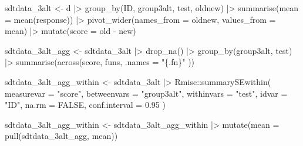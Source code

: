 \documentclass[
  man,floatsintext]{apa7}
\newenvironment{Shaded}{\begin{snugshade}}{\end{snugshade}}
\newcommand{\AttributeTok}[1]{\textcolor[rgb]{0.77,0.63,0.00}{#1}}
\newcommand{\ConstantTok}[1]{\textcolor[rgb]{0.00,0.00,0.00}{#1}}
\newcommand{\FloatTok}[1]{\textcolor[rgb]{0.00,0.00,0.81}{#1}}
\newcommand{\FunctionTok}[1]{\textcolor[rgb]{0.00,0.00,0.00}{#1}}
\newcommand{\NormalTok}[1]{#1}
\newcommand{\OtherTok}[1]{\textcolor[rgb]{0.56,0.35,0.01}{#1}}
\newcommand{\SpecialCharTok}[1]{\textcolor[rgb]{0.00,0.00,0.00}{#1}}
\newcommand{\StringTok}[1]{\textcolor[rgb]{0.31,0.60,0.02}{#1}}
\begin{document}
\begin{Shaded}
\begin{Highlighting}[]
\NormalTok{sdtdata\_3alt }\OtherTok{\textless{}{-}}\NormalTok{ d }\SpecialCharTok{|\textgreater{}}
  \FunctionTok{group\_by}\NormalTok{(ID, group3alt, test, oldnew) }\SpecialCharTok{|\textgreater{}}
  \FunctionTok{summarise}\NormalTok{(}\AttributeTok{mean =} \FunctionTok{mean}\NormalTok{(response)) }\SpecialCharTok{|\textgreater{}}
  \FunctionTok{pivot\_wider}\NormalTok{(}\AttributeTok{names\_from =}\NormalTok{ oldnew, }\AttributeTok{values\_from =}\NormalTok{ mean) }\SpecialCharTok{|\textgreater{}}
  \FunctionTok{mutate}\NormalTok{(}\AttributeTok{score =}\NormalTok{ old }\SpecialCharTok{{-}}\NormalTok{ new)}

\NormalTok{sdtdata\_3alt\_agg }\OtherTok{\textless{}{-}}\NormalTok{ sdtdata\_3alt }\SpecialCharTok{|\textgreater{}}
  \FunctionTok{drop\_na}\NormalTok{() }\SpecialCharTok{|\textgreater{}}
  \FunctionTok{group\_by}\NormalTok{(group3alt, test) }\SpecialCharTok{|\textgreater{}}
  \FunctionTok{summarise}\NormalTok{(}\FunctionTok{across}\NormalTok{(score, funs,}
    \AttributeTok{.names =} \StringTok{"\{.fn\}"}
\NormalTok{  ))}

\NormalTok{sdtdata\_3alt\_agg\_within }\OtherTok{\textless{}{-}}\NormalTok{ sdtdata\_3alt }\SpecialCharTok{|\textgreater{}}
\NormalTok{  Rmisc}\SpecialCharTok{::}\FunctionTok{summarySEwithin}\NormalTok{(}
    \AttributeTok{measurevar =} \StringTok{"score"}\NormalTok{,}
    \AttributeTok{betweenvars =} \StringTok{"group3alt"}\NormalTok{,}
    \AttributeTok{withinvars =} \StringTok{"test"}\NormalTok{,}
    \AttributeTok{idvar =} \StringTok{"ID"}\NormalTok{,}
    \AttributeTok{na.rm =} \ConstantTok{FALSE}\NormalTok{,}
    \AttributeTok{conf.interval =} \FloatTok{0.95}
\NormalTok{  )}

\NormalTok{sdtdata\_3alt\_agg\_within }\OtherTok{\textless{}{-}}\NormalTok{ sdtdata\_3alt\_agg\_within }\SpecialCharTok{|\textgreater{}}
  \FunctionTok{mutate}\NormalTok{(}\AttributeTok{mean =} \FunctionTok{pull}\NormalTok{(sdtdata\_3alt\_agg, mean))}


\end{Highlighting}
\end{Shaded}
\end{document}
